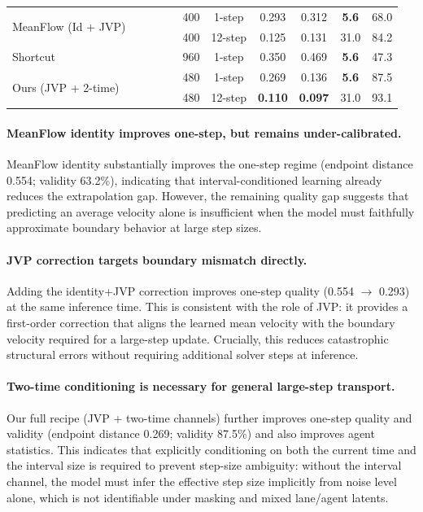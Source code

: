 \documentclass{article}
\newcommand{\cmark}{\textcolor{mydarkgray}{\ding{51}}}
\newcommand{\xmark}{\textcolor{mylightgray}{\ding{55}}}
\newcommand{\best}[1]{\textbf{#1}}
\theoremstyle{plain}
\theoremstyle{definition}
\theoremstyle{remark}
\begin{document}
\begin{table}[ht]
\begin{threeparttable}
\begin{tabular}{@{}l cccc c c cccc@{}}
\multirow{2}{*}{MeanFlow (Id + JVP)}
& \cmark & \cmark & \xmark & \xmark & 400 & 1-step  & 0.293 & 0.312 & \best{5.6} & 68.0 \\
& \cmark & \cmark & \xmark & \xmark & 400 & 12-step & 0.125 & 0.131 & 31.0 & 84.2 \\
\midrule

\multirow{1}{*}{Shortcut \cite{frans2024one}}
& \xmark & \xmark & \xmark & \cmark & 960 & 1-step & 0.350 & 0.469 & \best{5.6} & 47.3 \\
\midrule

\multirow{2}{*}{Ours (JVP + 2-time)}
& \cmark & \cmark & \cmark & \xmark & 480 & 1-step  & 0.269 & 0.136 & \best{5.6} & 87.5 \\
& \cmark & \cmark & \cmark & \xmark & 480 & 12-step & \best{0.110} & \best{0.097} & 31.0 & 93.1 \\
\bottomrule
\end{tabular}
\end{threeparttable}
\end{table}

\paragraph{MeanFlow identity improves one-step, but remains under-calibrated.}
MeanFlow identity substantially improves the one-step regime (endpoint distance 0.554; validity 63.2\%),
indicating that interval-conditioned learning already reduces the extrapolation gap.
However, the remaining quality gap suggests that predicting an average velocity alone is insufficient when the model must faithfully approximate boundary behavior
at large step sizes.

\paragraph{JVP correction targets boundary mismatch directly.}
Adding the identity+JVP correction improves one-step quality (0.554 \(\rightarrow\) 0.293) at the same inference time.
This is consistent with the role of JVP: it provides a first-order correction that aligns the learned mean velocity with the boundary velocity required for a large-step update.
Crucially, this reduces catastrophic structural errors without requiring additional solver steps at inference.

\paragraph{Two-time conditioning is necessary for general large-step transport.}
Our full recipe (JVP + two-time channels) further improves one-step quality and validity (endpoint distance 0.269; validity 87.5\%) and also improves agent statistics.
This indicates that explicitly conditioning on both the current time and the interval size is required to prevent step-size ambiguity:
without the interval channel, the model must infer the effective step size implicitly from noise level alone, which is not identifiable under masking and mixed lane/agent latents.
\end{document}
